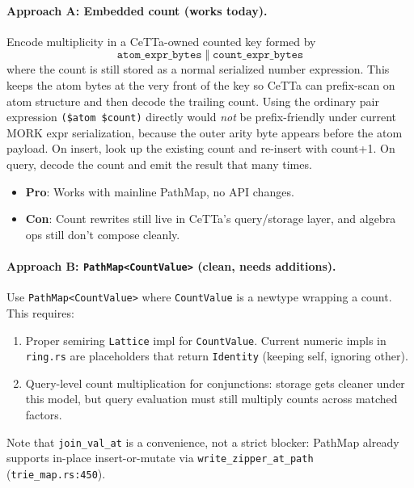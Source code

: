 \documentclass[11pt]{article}
\newcommand{\code}[1]{\texttt{#1}}
\newcommand{\PathMap}{\textup{PathMap}}
\begin{document}
\paragraph{Approach A: Embedded count (works today).}
Encode multiplicity in a CeTTa-owned counted key formed by
\[
  \texttt{atom\_expr\_bytes} \;\Vert\; \texttt{count\_expr\_bytes}
\]
where the count is still stored as a normal serialized number expression.
This keeps the atom bytes at the very front of the key so CeTTa can prefix-scan
on atom structure and then decode the trailing count.  Using the ordinary pair
expression \code{(\$atom \$count)} directly would \emph{not} be prefix-friendly
under current MORK expr serialization, because the outer arity byte appears
before the atom payload.  On insert, look up the existing count and re-insert
with count+1.  On query, decode the count and emit the result that many times.
\begin{itemize}[nosep]
  \item \textbf{Pro}: Works with mainline \PathMap{}, no API changes.
  \item \textbf{Con}: Count rewrites still live in CeTTa's query/storage layer,
    and algebra ops still don't compose cleanly.
\end{itemize}

\paragraph{Approach B: \code{PathMap<CountValue>} (clean, needs additions).}
Use \code{PathMap<CountValue>} where \code{CountValue} is a newtype
wrapping a count.  This requires:
\begin{enumerate}[nosep]
  \item Proper semiring \code{Lattice} impl for \code{CountValue}.
    Current numeric impls in \code{ring.rs} are placeholders that return
    \code{Identity} (keeping self, ignoring other).
  \item Query-level count multiplication for conjunctions: storage gets
    cleaner under this model, but query evaluation must still multiply
    counts across matched factors.
\end{enumerate}
Note that \code{join\_val\_at} is a convenience, not a strict blocker:
\PathMap{} already supports in-place insert-or-mutate via
\code{write\_zipper\_at\_path} (\code{trie\_map.rs:450}).
\end{document}
